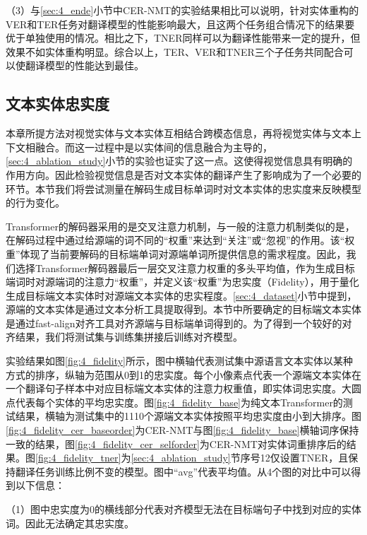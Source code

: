 （3）与\ref{sec:4_ende}小节中CER-NMT的实验结果相比可以说明，针对实体重构的VER和TER任务对翻译模型的性能影响最大，且这两个任务组合情况下的结果要优于单独使用的情况。相比之下，TNER同样可以为翻译性能带来一定的提升，但效果不如实体重构明显。综合以上，TER、VER和TNER三个子任务共同配合可以使翻译模型的性能达到最佳。


\subsection{文本实体忠实度}
\label{sec:4_fidelity}
本章所提方法对视觉实体与文本实体互相结合跨模态信息，再将视觉实体与文本上下文相融合。而这一过程中是以实体间的信息融合为主导的，\ref{sec:4_ablation_study}小节的实验也证实了这一点。这使得视觉信息具有明确的作用方向。因此检验视觉信息是否对文本实体的翻译产生了影响成为了一个必要的环节。本节我们将尝试测量在解码生成目标单词时对文本实体的忠实度来反映模型的行为变化。

Transformer的解码器采用的是交叉注意力机制，与一般的注意力机制类似的是，在解码过程中通过给源端的词不同的“权重”来达到“关注”或“忽视”的作用。该“权重”体现了当前要解码的目标端单词对源端单词所提供信息的需求程度。因此，我们选择Transformer解码器最后一层交叉注意力权重的多头平均值，作为生成目标端词时对源端词的注意力“权重”，并定义该“权重”为忠实度（Fidelity），用于量化生成目标端文本实体时对源端文本实体的忠实程度。\ref{sec:4_dataset}小节中提到，源端的文本实体是通过文本分析工具提取得到。本节中所要确定的目标端文本实体是通过fast-align\cite{45_dyer-etal-2013-simple}对齐工具对齐源端与目标端单词得到的。为了得到一个较好的对齐结果，我们将测试集与训练集拼接后训练对齐模型。


实验结果如图\ref{fig:4_fidelity}所示，图中横轴代表测试集中源语言文本实体以某种方式的排序，纵轴为范围从0到1的忠实度。每个小像素点代表一个源端文本实体在一个翻译句子样本中对应目标端文本实体的注意力权重值，即实体词忠实度。大圆点代表每个实体的平均忠实度。图\ref{fig:4_fidelity_base}为纯文本Transformer的测试结果，横轴为测试集中的1110个源端文本实体按照平均忠实度由小到大排序。图\ref{fig:4_fidelity_cer_baseorder}为CER-NMT与图\ref{fig:4_fidelity_base}横轴词序保持一致的结果，图\ref{fig:4_fidelity_cer_selforder}为CER-NMT对实体词重排序后的结果。图\ref{fig:4_fidelity_tner}为\ref{sec:4_ablation_study}节序号12仅设置TNER，且保持翻译任务训练比例不变的模型。图中“avg”代表平均值。从4个图的对比中可以得到以下信息：

（1）图中忠实度为0的横线部分代表对齐模型无法在目标端句子中找到对应的实体词。因此无法确定其忠实度。

